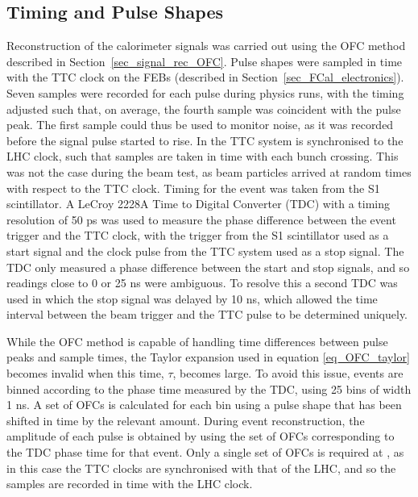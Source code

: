 \subsection{Timing and Pulse Shapes}
\label{sec_TBoverview_timing}
Reconstruction of the calorimeter signals was carried out using the OFC method described in Section~\ref{sec_signal_rec_OFC}.
Pulse shapes were sampled in time with the TTC clock on the FEBs (described in Section~\ref{sec_FCal_electronics}). Seven samples were recorded for each pulse during physics runs, with the timing adjusted such that, on average, the fourth sample was coincident with the pulse peak. The first sample could thus be used to monitor noise, as it was recorded before the signal pulse started to rise. In \atlas the TTC system is synchronised to the LHC clock, such that samples are taken in time with each bunch crossing. This was not the case during the beam test, as beam particles arrived at random times with respect to the TTC clock. Timing for the event was taken from the S1 scintillator. A LeCroy 2228A Time to Digital Converter (TDC)  with a timing resolution of 50 ps was used to measure the phase difference between the event trigger and the TTC clock, with the trigger from the S1 scintillator used as a start signal and the clock pulse from the TTC system used as a stop signal. The TDC only measured a phase difference between the start and stop signals, and so readings close to 0 or 25 ns were ambiguous. To resolve this a second TDC was used in which the stop signal was delayed by 10 ns, which allowed the time interval between the beam trigger and the TTC pulse to be determined uniquely. 

While the OFC method is capable of handling time differences between pulse peaks and sample times, the Taylor expansion used in equation \ref{eq_OFC_taylor} becomes invalid when this time, $\tau$, becomes large. To avoid this issue, events are binned according to the phase time measured by the TDC, using 25 bins of width 1 ns. A set of OFCs is calculated for each bin using a pulse shape that has been shifted in time by the relevant amount. During event reconstruction, the amplitude of each pulse is obtained by using the set of OFCs corresponding to the TDC phase time for that event. Only a single set of OFCs is required at \atlas, as in this case the TTC clocks are synchronised with that of the LHC, and so the samples are recorded in time with the LHC clock.


